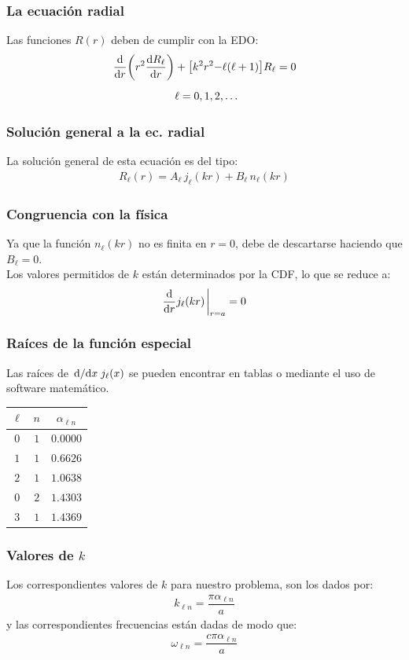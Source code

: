 \documentclass[12pt]{beamer}
\begin{document}
\begin{frame}
\frametitle{La ecuación radial}
Las funciones $R (r)$ deben de cumplir con la EDO:
\pause
\begin{align*}
\dv{r} \bigg( r^{2} \dv{R_{\ell}}{r} \bigg) &+ \big[ k^{2} r^{2} {-} \ell (\ell + 1) \big] R_{\ell} = 0 \\[0.5em]
&\ell = 0, 1, 2, \ldots
\end{align*}
\end{frame}
\begin{frame}
\frametitle{Solución general a la ec. radial}
La solución general de esta ecuación es del tipo:
\pause
\begin{align*}
R_{\ell} (r) = A_{\ell} \, j_{\ell} (k r) + B_{\ell} \, n_{\ell} (k r) 
\end{align*}
\end{frame}
\begin{frame}
\frametitle{Congruencia con la física}
Ya que la función $n_{\ell} (k r)$ no es finita en $r = 0$, \pause debe de descartarse haciendo que $B_{\ell} = 0$.
\\
\bigskip
\pause
Los valores permitidos de $k$ están determinados por la CDF, lo que se reduce a:
\begin{align*}
\dv{r} j_{\ell} (k r) \eval_{r=a} = 0
\end{align*}
\end{frame}
\begin{frame}
\frametitle{Raíces de la función especial}
Las raíces de $\dv*{x} j_{\ell} (x)$ se pueden encontrar en tablas o mediante el uso de software matemático.
\pause
\begin{table}[H]
\centering
\large
\renewcommand{\arraystretch}{0.9}
\begin{tabular}{c c c}
$\ell$ & $n$ & $\alpha_{\ell n}$ \\ \hline
$0$ & $1$ & $0.0000$ \\ \hline
$1$ & $1$ & $0.6626$ \\ \hline
$2$ & $1$ & $1.0638$ \\ \hline
$0$ & $2$ & $1.4303$ \\ \hline
$3$ & $1$ & $1.4369$ \\ \hline
\end{tabular}
\end{table}
\end{frame}
\begin{frame}
\frametitle{Valores de $k$}
Los correspondientes valores de $k$ para nuestro problema, son los dados por:
\pause
\begin{align*}
k_{\ell n} = \dfrac{\pi \alpha_{\ell n}}{a}
\end{align*}
\pause
y las correspondientes frecuencias están dadas de modo que:
\begin{align*}
\omega_{\ell n} = \dfrac{c \pi \alpha_{\ell n}}{a}
\end{align*}
\end{frame}
\end{document}
